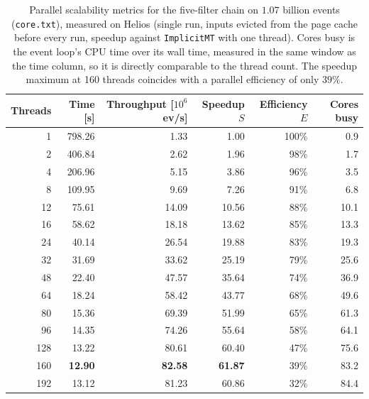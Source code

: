 \begin{table}[htbp]
\centering
\caption{Parallel scalability metrics for the five-filter chain on $1.07$ billion events (\texttt{core.txt}), measured on Helios (single run, inputs evicted from the page cache before every run, speedup against \texttt{ImplicitMT} with one thread). Cores busy is the event loop's CPU time over its wall time, measured in the same window as the time column, so it is directly comparable to the thread count. The speedup maximum at 160 threads coincides with a parallel efficiency of only $39\%$.}
\label{tab:scalability-chain}
\begin{tabular}{rrrrrr}
\toprule
Threads & Time [s] & Throughput [$10^6$ ev/s] & Speedup $S$ & Efficiency $E$ & Cores busy \\
\midrule
 1 & 798.26 & 1.33 & 1.00 & 100\% & 0.9 \\
 2 & 406.84 & 2.62 & 1.96 & 98\% & 1.7 \\
 4 & 206.96 & 5.15 & 3.86 & 96\% & 3.5 \\
 8 & 109.95 & 9.69 & 7.26 & 91\% & 6.8 \\
12 & 75.61 & 14.09 & 10.56 & 88\% & 10.1 \\
16 & 58.62 & 18.18 & 13.62 & 85\% & 13.3 \\
24 & 40.14 & 26.54 & 19.88 & 83\% & 19.3 \\
32 & 31.69 & 33.62 & 25.19 & 79\% & 25.6 \\
48 & 22.40 & 47.57 & 35.64 & 74\% & 36.9 \\
64 & 18.24 & 58.42 & 43.77 & 68\% & 49.6 \\
80 & 15.36 & 69.39 & 51.99 & 65\% & 61.3 \\
96 & 14.35 & 74.26 & 55.64 & 58\% & 64.1 \\
128 & 13.22 & 80.61 & 60.40 & 47\% & 75.6 \\
160 & \textbf{12.90} & \textbf{82.58} & \textbf{61.87} & 39\% & 83.2 \\
192 & 13.12 & 81.23 & 60.86 & 32\% & 84.4 \\
\bottomrule
\end{tabular}
\end{table}
